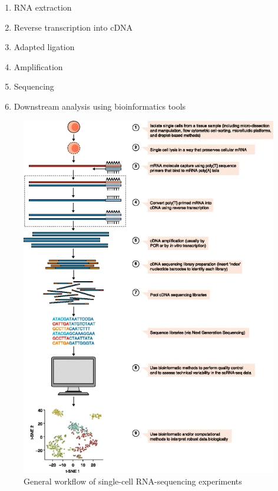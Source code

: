\begin{enumerate}
   \item RNA extraction
   \item Reverse transcription into cDNA
   \item Adapted ligation
   \item Amplification
   \item Sequencing
   \item Downstream analysis using bioinformatics tools
\end{enumerate}

\begin{figure}[!htb]
\begin{center}
\includegraphics{figure/scrna_protocol.png}
\end{center}
\caption{General workflow of single-cell RNA-sequencing experiments \citep{scrna_seq}}
\label{fig:SC_RNA}
\end{figure}
\FloatBarrier

